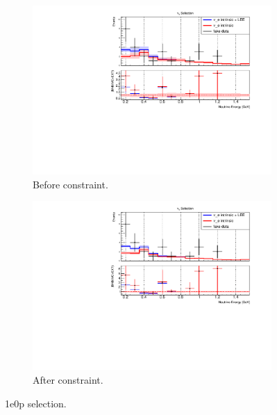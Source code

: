\begin{figure}[H] 
\begin{center}
    \begin{subfigure}[b]{0.45\textwidth}
    \centering
    \includegraphics[width=1.00\textwidth]{Fakedata/set1/1e0p_numu_reco_e_H1_mc_fakedata_set1_nue_before_data_constraint.pdf}
    \caption{\label{fig:fakedata:set1:zp_before_constrain} Before constraint.}
    \end{subfigure}
    \begin{subfigure}[b]{0.45\textwidth}
    \centering
    \includegraphics[width=1.00\textwidth]{Fakedata/set1/1e0p_numu_reco_e_H1_mc_fakedata_set1_univ_overlay_nue.pdf}
    \caption{\label{fig:fakedata:set1:zp_after_constrain} After constraint.}
    \end{subfigure}
\caption{\label{fig:fakedata:set1:zp_const} 1e0p selection.}
\end{center}
\end{figure}

